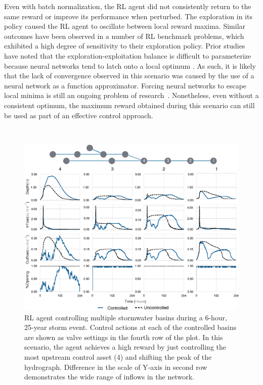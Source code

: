 Even with batch normalization, the RL agent did not consistently return to the same reward or improve its performance when perturbed.
The exploration in its policy caused the RL agent to oscillate between local reward maxima.
Similar outcomes have been observed in a number of RL benchmark problems\cite{henderson2017Deep, Mnih2015}, which exhibited a high degree of sensitivity to their exploration policy.
Prior studies have noted that the exploration-exploitation balance is difficult to parameterize because neural networks tend to latch onto a local optimum \cite{larochelle2009exploring}.
As such, it is likely that the lack of convergence observed in this scenario was caused by the use of a neural network as a function approximator.
Forcing neural networks to escape local minima is still an ongoing problem of research~\cite{osband2016Deep}.
Nonetheless, even without a consistent optimum, the maximum reward obtained during this scenario can still be used as part of an effective control approach.

\


\begin{figure}
    \centering
        \includegraphics[width=\textwidth]{gfx/Chapter-3/system_scale_1.eps}
    \caption{RL agent controlling multiple stormwater basins during a 6-hour, 25-year storm event. Control actions at each of the controlled basins are shown as valve settings in the fourth row of the plot. In this scenario, the agent achieves a high reward by just controlling the most upstream control asset (4) and shifting the peak of the hydrograph. Difference in the scale of Y-axis in second row demonstrates the wide range of inflows in the network.}\label{fig:ch3-fig5}
\end{figure}

